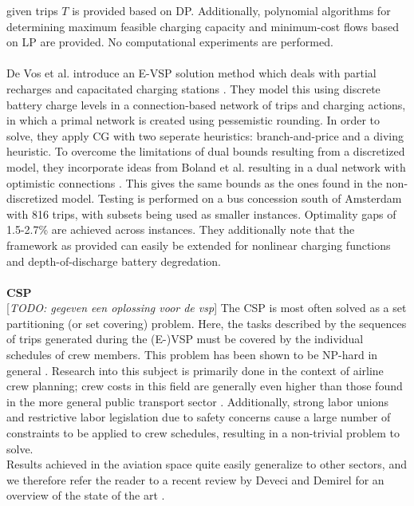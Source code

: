 \documentclass[]{article}
\newcommand{\todo}[1]{{\color{red}[\textit{TODO: #1}]}}
\begin{document}
given trips $T$ is provided based on DP. Additionally, polynomial algorithms
for determining maximum feasible charging capacity and minimum-cost flows based
on LP are provided. No computational experiments are performed. \\\\
De Vos et al. introduce an E-VSP solution method which deals with partial
recharges and capacitated charging stations \cite{deVos2024}. They model this
using discrete battery charge levels in a connection-based network of trips and
charging actions, in which a primal network is created using pessemistic
rounding. In order to solve, they apply CG with two seperate heuristics:
branch-and-price and a diving heuristic. To overcome the limitations of dual
bounds resulting from a discretized model, they incorporate ideas from Boland
et al. resulting in a dual network with optimistic connections
\cite{Boland2017}. This gives the same bounds as the ones found in the
non-discretized model. Testing is performed on a bus concession south of
Amsterdam with 816 trips, with subsets being used as smaller instances.
Optimality gaps of 1.5-2.7\% are achieved across instances. They additionally
note that the framework as provided can easily be extended for nonlinear
charging functions and depth-of-discharge battery degredation. \\\\

\noindent \textbf{CSP}\\
\todo{gegeven een oplossing voor de vsp}
The CSP is most often solved as a set partitioning (or set covering) problem. Here, the tasks described by the sequences of trips generated during the (E-)VSP must be covered by the individual schedules of crew members. This problem has been shown to be NP-hard in general \cite{Fischetti1989}. Research into this subject is primarily done in the context of airline crew planning; crew costs in this field are generally even higher than those found in the more general public transport sector \cite{Barnhart2003}. Additionally, strong labor unions and restrictive labor legislation due to safety concerns cause a large number of constraints to be applied to crew schedules, resulting in a non-trivial problem to solve. \\
Results achieved in the aviation space quite easily generalize to other sectors, and we therefore refer the reader to a recent review by Deveci and Demirel for an overview of the state of the art \cite{Deveci2018}. \\\\
\end{document}

